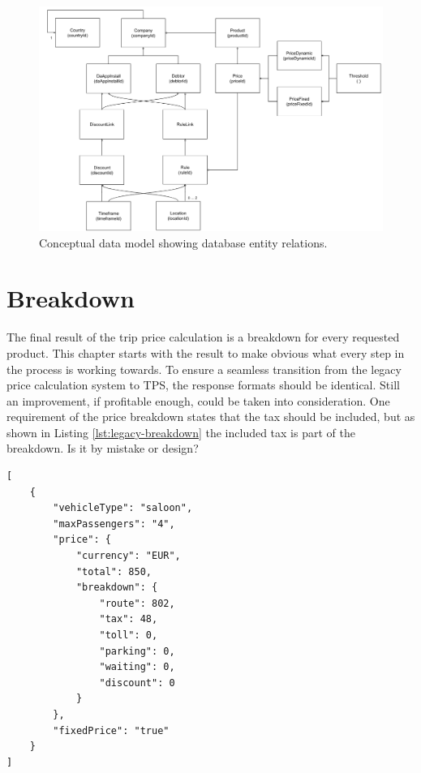 \begin{figure}[H]
	\centering
	\includegraphics[width=1\textwidth]{DataModel}
	\caption[DataModel]{Conceptual data model showing database entity relations.}
	\label{fig:DataModel}
\end{figure}

%
\section{Breakdown}
The final result of the trip price calculation is a breakdown for every requested product. This chapter starts with the result to make obvious what every step in the process is working towards. To ensure a seamless transition from the legacy price calculation system to TPS, the response formats should be identical. Still an improvement, if profitable enough, could be taken into consideration. One requirement of the price breakdown states that the tax should be included, but as shown in Listing \ref{lst:legacy-breakdown} the included tax is part of the breakdown. Is it by mistake or design?

\begin{lstlisting}[caption={Legacy price breakdown}, label={lst:legacy-breakdown}]
[
	{
		"vehicleType": "saloon",
		"maxPassengers": "4",
		"price": {
			"currency": "EUR",
			"total": 850,
			"breakdown": {
				"route": 802,
				"tax": 48,
				"toll": 0,
				"parking": 0,
				"waiting": 0,
				"discount": 0
			}
		},
		"fixedPrice": "true"
	}
]
\end{lstlisting}

